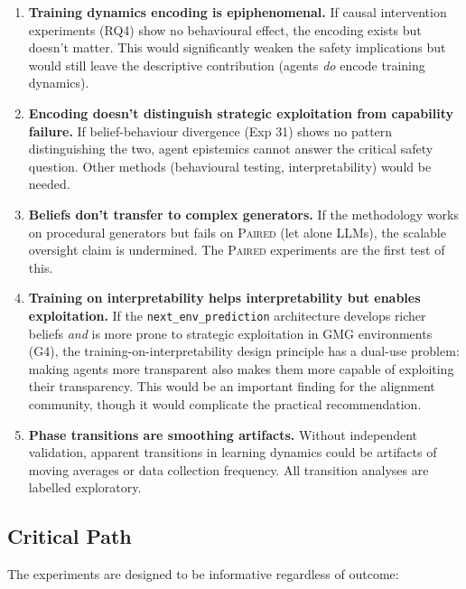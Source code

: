 \documentclass[11pt,a4paper]{article}
\theoremstyle{remark}
\newcommand{\paired}{\textsc{Paired}}
\begin{document}
\begin{enumerate}
    \item \textbf{Training dynamics encoding is epiphenomenal.} If causal intervention experiments (RQ4) show no behavioural effect, the encoding exists but doesn't matter. This would significantly weaken the safety implications but would still leave the descriptive contribution (agents \textit{do} encode training dynamics).

    \item \textbf{Encoding doesn't distinguish strategic exploitation from capability failure.} If belief-behaviour divergence (Exp 31) shows no pattern distinguishing the two, agent epistemics cannot answer the critical safety question. Other methods (behavioural testing, interpretability) would be needed.

    \item \textbf{Beliefs don't transfer to complex generators.} If the methodology works on procedural generators but fails on \paired{} (let alone LLMs), the scalable oversight claim is undermined. The \paired{} experiments are the first test of this.

    \item \textbf{Training on interpretability helps interpretability but enables exploitation.} If the \texttt{next\_env\_prediction} architecture develops richer beliefs \textit{and} is more prone to strategic exploitation in GMG environments (G4), the training-on-interpretability design principle has a dual-use problem: making agents more transparent also makes them more capable of exploiting their transparency. This would be an important finding for the alignment community, though it would complicate the practical recommendation.

    \item \textbf{Phase transitions are smoothing artifacts.} Without independent validation, apparent transitions in learning dynamics could be artifacts of moving averages or data collection frequency. All transition analyses are labelled exploratory.
\end{enumerate}

\subsection{Critical Path}

The experiments are designed to be informative regardless of outcome:
\end{document}
